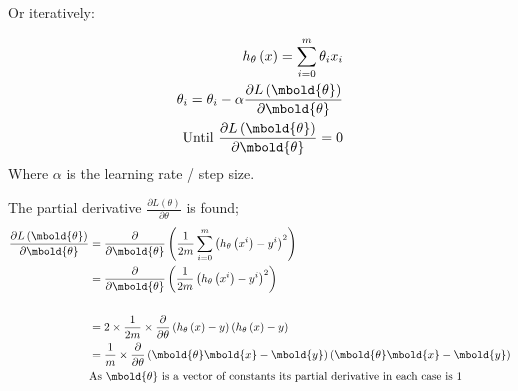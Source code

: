 \documentclass[12pt letter]{report}
\begin{document}
Or iteratively:

\begin{align*}
  h_{\theta} \left( x \right)  = \displaystyle\sum_{i=0}^{m} \theta_i x_i                               \\
  \theta_i = \theta_i - \alpha \frac{\partial L \left( \mbold{\theta} \right)}{\partial \mbold{\theta}} \\
  \text{Until } \frac{\partial L \left( \mbold{\theta} \right)}{\partial \mbold{\theta}} = 0
\end{align*}
Where $\alpha$ is the learning rate / step size.

The partial derivative $\frac{\partial L \left( \theta \right) }{\partial \theta}$ is  found;
\begin{align*}
  \frac{\partial L \left( \mbold{\theta} \right) }{\partial \mbold{\theta}} & = \frac{\partial}{\partial \mbold{\theta}} \left(   \frac{1}{2m}
  \displaystyle\sum_{i=0}^{m} \left( h_{\theta} \left( x^i \right) - y^i   \right)^2 \right)                                                                                                                  \\
                                                                            & = \frac{\partial}{\partial \mbold{\theta}} \left(   \frac{1}{2m} \left( h_{\theta} \left( x^i \right) - y^i   \right)^2 \right) \\ \\
                                                                            & = 2 \times \frac{1}{2m} \times  \frac{\partial}{\partial
  \theta}\left( h_{\theta} \left( x \right) - y  \right) \left( h_{\theta} \left( x \right) - y  \right)                                                                                                      \\
                                                                            & = \frac{1}{m} \times \frac{\partial}{\partial \theta}
  \left( \mbold{\theta} \mbold{x} - \mbold{y} \right) \left( \mbold{\theta} \mbold{x} - \mbold{y} \right)                                                                                                     \\
                                                                            & \text{As $\mbold{\theta}$ is a vector of constants its
  partial derivative in each case is 1}                                                                                                                                                                       \\

\end{align*}
\end{document}
